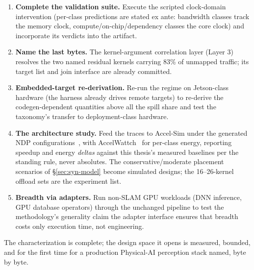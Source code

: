 \begin{enumerate}
    \item \textbf{Complete the validation suite.} Execute the scripted clock-domain intervention (per-class predictions are stated ex ante: bandwidth classes track the memory clock, compute/on-chip/dependency classes the core clock) and incorporate its verdicts into the artifact.
    \item \textbf{Name the last bytes.} The kernel-argument correlation layer (Layer 3) resolves the two named residual kernels carrying 83\% of unmapped traffic; its target list and join interface are already committed.
    \item \textbf{Embedded-target re-derivation.} Re-run the regime on Jetson-class hardware (the harness already drives remote targets) to re-derive the codegen-dependent quantities above all the spill share and test the taxonomy's transfer to deployment-class hardware.
    \item \textbf{The architecture study.} Feed the traces to Accel-Sim under the generated NDP configurations~\cite{khairy2020accelsim}, with AccelWattch~\cite{kandiah2021accelwattch} for per-class energy, reporting speedup and energy \emph{deltas} against this thesis's measured baselines per the standing rule, never absolutes. The conservative/moderate placement scenarios of \S\ref{sec:syn-model} become simulated designs; the 16--26-kernel offload sets are the experiment list.
    \item \textbf{Breadth via adapters.} Run non-SLAM GPU workloads (DNN inference, GPU database operators) through the unchanged pipeline to test the methodology's generality claim the adapter interface ensures that breadth costs only execution time, not engineering.
\end{enumerate}

The characterization is complete; the design space it opens is measured, bounded, and for the first time for a production Physical-AI perception stack named, byte by byte.

